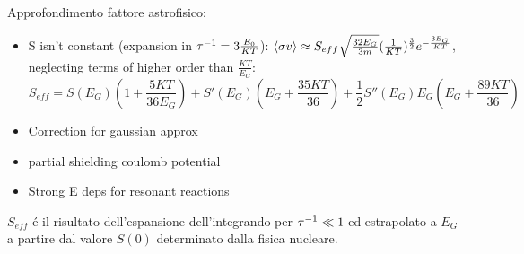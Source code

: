 \begin{frame}{Approfondimento fattore astrofisico: }
    \begin{itemize}
        \item S isn't constant (expansion in ${\tau}^{-1}=3\frac{E_0}{KT}$): $\langle \sigma v \rangle\approx S_{eff}\sqrt{\frac{32E_G}{3m}}(\frac{1}{KT})^{\frac{3}{2}}e^{-\frac{3E_G}{KT}}$, neglecting terms of higher order than $\frac{KT}{E_G}$:
            \begin{equation*}
                S_{eff}=S(E_G)(1+\frac{5KT}{36E_G})+S'(E_G)(E_G+\frac{35KT}{36})+\frac{1}{2}S''(E_G)E_G(E_G+\frac{89KT}{36})
            \end{equation*}
\item Correction for gaussian approx
    \item partial shielding coulomb potential
        \item Strong E deps for resonant reactions
        \end{itemize}
$S_{eff}$ \'e il risultato dell'espansione dell'integrando per ${\tau}^{-1}\ll1$ ed estrapolato a $E_G$ a partire dal valore $S(0)$ determinato dalla fisica nucleare.
\end{frame}

